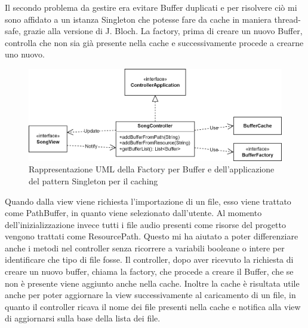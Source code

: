 \documentclass[a4paper,12pt]{report}
\begin{document}
Il secondo problema da gestire era evitare Buffer duplicati e per risolvere ciò mi sono affidato a un istanza Singleton che potesse fare da cache in maniera thread-safe, grazie alla versione di J. Bloch. La factory, prima di creare un nuovo Buffer, controlla che non sia già presente nella cache e successivamente procede a crearne uno nuovo.
%
\begin{figure}[H]
\centering{}
\includegraphics[width=\textwidth]{img/BufferMVC.png}
\caption{Rappresentazione UML della Factory per Buffer e dell’applicazione del pattern Singleton per il caching}
\label{img:buffermvc}
\end{figure}
Quando dalla view viene richiesta l’importazione di un file, esso viene trattato come PathBuffer, in quanto viene selezionato dall’utente. Al momento dell’inizializzazione invece tutti i file audio presenti come risorse del progetto vengono trattati come ResourcePath. Questo mi ha aiutato a poter differenziare anche i metodi nel controller senza ricorrere a variabili booleane o intere per identificare che tipo di file fosse. Il controller, dopo aver ricevuto la richiesta di creare un nuovo buffer, chiama la factory, che procede a creare il Buffer, che se non è presente viene aggiunto anche nella cache. Inoltre la cache è risultata utile anche per poter aggiornare la view successivamente al caricamento di un file, in quanto il controller ricava il nome dei file presenti nella cache e notifica alla view di aggiornarsi sulla base della lista dei file.
%
\end{document}
